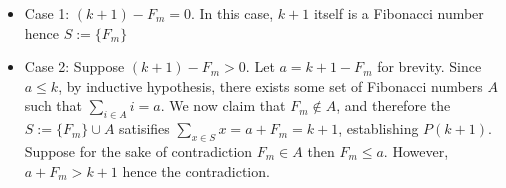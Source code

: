 \documentclass[10pt]{exam}
\begin{document}
\begin{parts}
\begin{customsolutionbox}
        \begin{itemize}
            \item Case 1:  $(k+1)-F_m = 0$. In this case, $k+1$ itself is a Fibonacci number hence $S := \{F_m\}$
            \item Case 2: Suppose $(k+1)- F_m > 0$. Let $a = k + 1 - F_m$ for brevity.
            Since $a \leq k$, by inductive hypothesis, there exists some set of Fibonacci numbers $A$ such that $\sum_{i \in A} i = a$.
            We now claim that $F_m \not \in A$, and therefore the $S := \{F_m\} \cup A$ satisifies $\sum_{x \in  S} x = a + F_m = k+1$, establishing $P(k+1)$. Suppose for the sake of contradiction $F_m \in A$ then $F_m \leq a$. However, $a + F_m > k+1$ hence the contradiction.
        \end{itemize}
    \end{customsolutionbox}
\end{parts}
\end{document}
